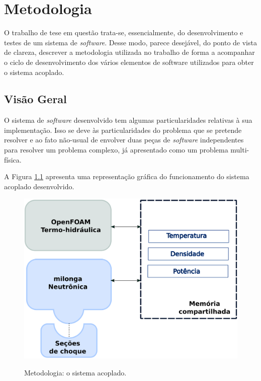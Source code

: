 \chapter{Metodologia}
\label{chap:metodologia}

O trabalho de tese em questão trata-se, essencialmente, do desenvolvimento e testes
de um sistema de \textit{software}. Desse modo, parece desejável, do ponto de vista de
clareza, descrever a metodologia utilizada no trabalho de forma a acompanhar o ciclo
de desenvolvimento dos vários elementos de software utilizados para obter o sistema
acoplado.

\section{Visão Geral}

O sistema de \textit{software} desenvolvido tem algumas particularidades relativas à sua
implementação. Isso se deve às particularidades do problema que se pretende resolver e ao
fato não-usual de envolver duas peças de \textit{software} independentes para resolver
um problema complexo, já apresentado como um problema multi-física.

A Figura \ref{metodoetapas} apresenta uma representação gráfica do funcionamento do sistema
acoplado desenvolvido.

\begin{figure}[htb]
  \caption{Metodologia: o sistema acoplado.}
  \centering\includegraphics[scale=0.7]{figuras/metodologia1.png}
  \label{metodoetapas}
\end{figure}

